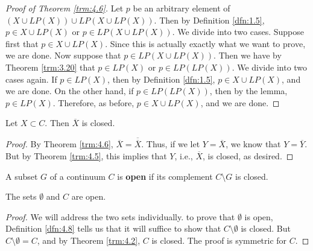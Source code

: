 \documentclass[../main.tex]{subfiles}
\begin{document}
\begin{theorem}
\begin{proof}[Proof of Theorem \ref{trm:4.6}]
        Let $p$ be an arbitrary element of $(X\cup LP(X))\cup LP(X\cup LP(X))$. Then by Definition \ref{dfn:1.5}, $p\in X\cup LP(X)$ or $p\in LP(X\cup LP(X))$. We divide into two cases. Suppose first that $p\in X\cup LP(X)$. Since this is actually exactly what we want to prove, we are done. Now suppose that $p\in LP(X\cup LP(X))$. Then we have by Theorem \ref{trm:3.20} that $p\in LP(X)$ or $p\in LP(LP(X))$. We divide into two cases again. If $p\in LP(X)$, then by Definition \ref{dfn:1.5}, $p\in X\cup LP(X)$, and we are done. On the other hand, if $p\in LP(LP(X))$, then by the lemma, $p\in LP(X)$. Therefore, as before, $p\in X\cup LP(X)$, and we are done.
    \end{proof}
\end{theorem}

\begin{corollary}\label{cly:4.7}
    Let $X\subset C$. Then $\overline{X}$ is closed.
    \begin{proof}
        By Theorem \ref{trm:4.6}, $\overline{X}=\overline{\overline{X}}$. Thus, if we let $Y=\overline{X}$, we know that $Y=\overline{Y}$. But by Theorem \ref{trm:4.5}, this implies that $Y$, i.e., $\overline{X}$, is closed, as desired.
    \end{proof}
\end{corollary}

\begin{definition}\label{dfn:4.8}
    A subset $G$ of a continuum $C$ is \textbf{open} if its complement $C\setminus G$ is closed.
\end{definition}

\begin{theorem}\label{trm:4.9}
    The sets $\emptyset$ and $C$ are open.
    \begin{proof}
        We will address the two sets individually. to prove that $\emptyset$ is open, Definition \ref{dfn:4.8} tells us that it will suffice to show that $C\setminus\emptyset$ is closed. But $C\setminus\emptyset=C$, and by Theorem \ref{trm:4.2}, $C$ is closed. The proof is symmetric for $C$.
    \end{proof}
\end{theorem}
\end{document}

